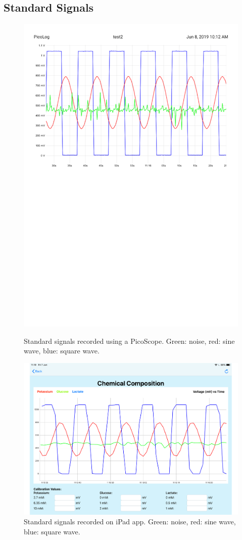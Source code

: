 \subsection{Standard Signals}

\begin{figure}[h!]
\centering
\includegraphics[trim={0cm 0cm 0cm  0cm}, clip, width=.75\textwidth]{./figures/standardsignals/picologChemComp.pdf}
\captionsetup{justification=centering}
\caption{Standard signals recorded using a PicoScope. Green: noise, red: sine wave, blue: square wave.}
\label{fig: test1 picolog}
\bigbreak
\includegraphics[trim={0cm 0cm 0cm  0cm}, clip, width=.75\textwidth]{./figures/standardsignals/appChemComp.pdf}
\captionsetup{justification=centering}
\caption{Standard signals recorded on iPad app. Green: noise, red: sine wave, blue: square wave.}
\label{fig: test1 app}
\end{figure}



